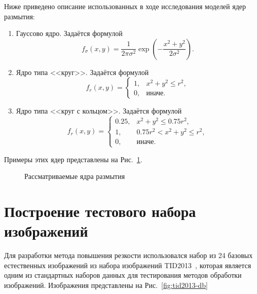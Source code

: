 Ниже приведено описание использованных в ходе исследования моделей ядер размытия:
\begin{enumerate}[beginpenalty=10000]
	\item Гауссово ядро.
	Задаётся формулой
	$$f_\sigma\left(x,y\right) = \frac{1}{2\pi\sigma^2}\exp\left(-\frac{x^2+y^2}{2\sigma^2}\right).$$
	
	\item Ядро типа <<круг>>.
	Задаётся формулой $$f_r\left(x,y\right) = \begin{cases}
		1, & x^2 + y^2 \leq r^2, \\
		0, & \text{иначе}.
	\end{cases}$$
	
	\item Ядро типа <<круг с кольцом>>.
	Задаётся формулой $$f_r(x, y) = \begin{cases}
		0.25, & x^2 + y^2 \leq 0.75 r^2,\\
		1, & 0.75 r^2 < x^2 + y^2 \leq r^2,\\
		0, & \text{иначе}.
	\end{cases}$$
\end{enumerate}

Примеры этих ядер представлены на Рис.~\ref{fig:warping-psf-examples}. %

\begin{figure}[ht]
	\caption{Рассматриваемые ядра размытия}
	\label{fig:warping-psf-examples}
\end{figure}

\section{Построение тестового набора изображений}

Для разработки метода повышения резкости использовался набор из 24 базовых естественных изображений из набора изображений TID2013~\cite{ponomarenko2015image}, которая является одним из стандартных наборов данных для тестирования методов обработки изображений. Изображения представлены на Рис.~\ref{fig:tid2013-db}

